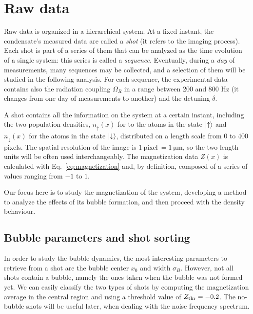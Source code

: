 \section{Raw data}
Raw data is organized in a hierarchical system. At a fixed instant, the condensate's measured data are called a \textit{shot} (it refers to the imaging process). Each shot is part of a series of them that can be analyzed as the time evolution of a single system: this series is called a \textit{sequence}. Eventually, during a \textit{day} of measurements, many sequences may be collected, and a selection of them will be studied in the following analysis. For each sequence, the experimental data contains also the radiation coupling $\Omega_R$ in a range between 200 and 800 \unit{\hertz} (it changes from one day of measurements to another) and the detuning $\delta$.

A shot contains all the information on the system at a certain instant, including the two population densities, $n_\uparrow(x)$ for to the atoms in the state $\ket{\uparrow}$ and $n_\downarrow(x)$ for the atoms in the state $\ket{\downarrow}$, distributed on a length scale from 0 to 400 pixels. The spatial resolution of the image is $1\ \text{pixel}\ = 1\ \unit{\micro\meter}$, so the two length units will be often used interchangeably. The magnetization data $Z(x)$ is calculated with Eq.\ \eqref{eq:magnetization} and, by definition, composed of a series of values ranging from $-1$ to $1$.

Our focus here is to study the magnetization of the system, developing a method to analyze the effects of its bubble formation, and then proceed with the density behaviour.

\subsection{Bubble parameters and shot sorting}
In order to study the bubble dynamics, the most interesting parameters to retrieve from a shot are the bubble center $x_0$ and width $\sigma_B$. However, not all shots contain a bubble, namely the ones taken when the bubble was not formed yet. We can easily classify the two types of shots by computing the magnetization average in the central region and using a threshold value of $Z_{\rm thr} = -0.2$. The no-bubble shots will be useful later, when dealing with the noise frequency spectrum.

